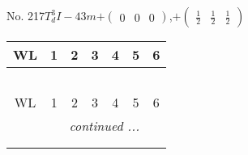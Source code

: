 \documentclass[fleqn,9pt,landscape]{jsarticle}
\begin{document}
\begin{center}
\begin{longtable}{ccccccc}
\end{longtable}
\end{center}
\newpage
No. 217\quad$T_{d}^{3}$\quad$I-43m$\quad[ cubic ]\quad$+\begin{pmatrix} 0 & 0 & 0 \end{pmatrix}$,\quad $+\begin{pmatrix} \frac{1}{2} & \frac{1}{2} & \frac{1}{2} \end{pmatrix}$
\begin{center}
\renewcommand{\arraystretch}{1.2}
\begin{longtable}{ccccccc}
 \hline \hline
WL & 1 & 2 & 3 & 4 & 5 & 6 \\ \hline \endfirsthead

\multicolumn{6}{l}{\tablename\ \thetable{}} \\
 \hline \hline
WL & 1 & 2 & 3 & 4 & 5 & 6 \\ \hline \endhead

 \hline \hline
\multicolumn{6}{r}{\footnotesize\it continued ...} \\ \endfoot

 \hline \hline
\multicolumn{6}{r}{} \\ \endlastfoot


\end{longtable}
\end{center}
\end{document}
